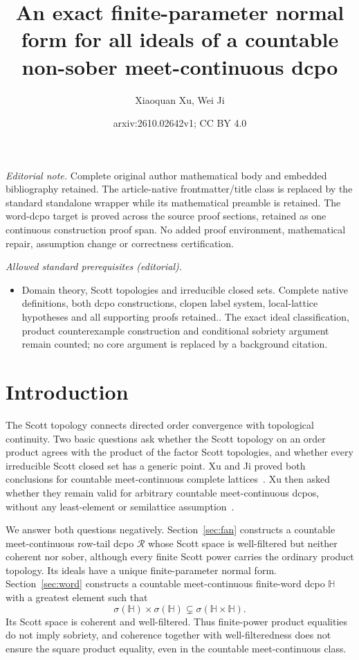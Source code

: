 \documentclass[10pt,a4paper]{article}
\title{An exact finite-parameter normal form for all ideals of a countable non-sober meet-continuous dcpo}
\author{Xiaoquan Xu, Wei Ji}
\date{arxiv:2610.02642v1; CC BY 4.0}
\theoremstyle{definition}
\newcommand{\HH}{\mathbb H}
\newcommand{\RR}{\mathcal R}
\begin{document}
\maketitle
\noindent\textit{Editorial note.} Complete original author mathematical body and embedded bibliography retained. The article-native frontmatter/title class is replaced by the standard standalone wrapper while its mathematical preamble is retained. The word-dcpo target is proved across the source proof sections, retained as one continuous construction proof span. No added proof environment, mathematical repair, assumption change or correctness certification.\par\medskip
\noindent\textit{Allowed standard prerequisites (editorial).}\begin{itemize}
\item Domain theory, Scott topologies and irreducible closed sets. Complete native definitions, both dcpo constructions, clopen label system, local-lattice hypotheses and all supporting proofs retained.. The exact ideal classification, product counterexample construction and conditional sobriety argument remain counted; no core argument is replaced by a background citation.
\end{itemize}\medskip
\section{Introduction}\label{sec:intro}
The Scott topology connects directed order convergence with topological continuity. Two basic questions ask whether the Scott topology on an order product agrees with the product of the factor Scott topologies, and whether every irreducible Scott closed set has a generic point. Xu and Ji proved both conclusions for countable meet-continuous complete lattices~\cite[Theorem~1.1]{XuJi}. Xu then asked whether they remain valid for arbitrary countable meet-continuous dcpos, without any least-element or semilattice assumption~\cite[Questions~1.1 and~1.2]{Xu}.

We answer both questions negatively. Section~\ref{sec:fan} constructs a countable meet-continuous row-tail dcpo $\RR$ whose Scott space is well-filtered but neither coherent nor sober, although every finite Scott power carries the ordinary product topology. Its ideals have a unique finite-parameter normal form. Section~\ref{sec:word} constructs a countable meet-continuous finite-word dcpo $\HH$ with a greatest element such that
\[
 \sigma(\HH)\times\sigma(\HH)\subsetneq\sigma(\HH\times\HH).
\]
Its Scott space is coherent and well-filtered. Thus finite-power product equalities do not imply sobriety, and coherence together with well-filteredness does not ensure the square product equality, even in the countable meet-continuous class.
\end{document}
